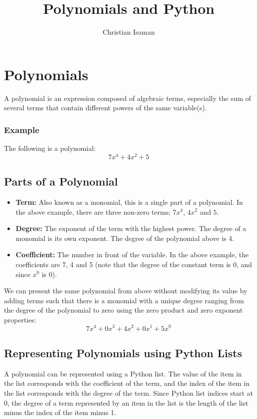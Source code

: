 \documentclass{article}
\title{Polynomials and Python}
\author{Christian Isaman}
\date{}
\begin{document}
\maketitle

\section*{Polynomials}

A polynomial is an expression composed of algebraic terms, especially the sum of several terms that contain different powers of the same variable(s).

\subsubsection*{Example}
The following is a polynomial:
$$ 7x^4 + 4x^2 + 5 $$

\subsection*{Parts of a Polynomial}
\begin{itemize}
    \item \textbf{Term:} Also known as a monomial, this is a single part of a polynomial.  In the above example, there are three non-zero terms; \( 7x^4 \), \( 4x^2 \) and \( 5 \).
    \item \textbf{Degree:} The exponent of the term with the highest power. The degree of a monomial is its own exponent. The degree of the polynomial above is 4.
    \item \textbf{Coefficient:} The number in front of the variable. In the above example, the coefficients are 7, 4 and 5 (note that the degree of the constant term is 0, and since \(x^0\) is 0).
\end{itemize}

We can present the same polynomial from above without modifying its value by adding terms such that there is a monomial with a unique degree ranging from the degree of the polynomial to zero using the zero product and zero exponent properties:
$$ 7x^4 + 0x^3 + 4x^2 + 0x^1 + 5x^0 $$

\subsection*{Representing Polynomials using Python Lists}

A polynomial can be represented using a Python list. The value of the item in the list corresponds with the coefficient of the term, and the index of the item in the list corresponds with the degree of the term. Since Python list indices start at 0, the degree of a term represented by an item in the list is the length of the list minus the index of the item minus 1.
\end{document}
